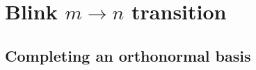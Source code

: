 \documentclass{article}
\begin{document}
%
%
%
%
%
%
%
%
%
%
%
%
%
%

%

%
%
%
%
%
%
%
%
%
%

%
%
%
%
%
%
%
	
%
%
%
%
%
%
%

%
%
%
	
%
%
%
%

%
%
%
%
%
%
%
%
%
%
%
%
%
%
%
%



%
%
%
%
%
%
%
%
%
%
%
%
%
%
%
%
%
%
%
%
%
%
%
%
%
%
%
%
%
%
%
%
%
%
%
%
%
%
%
%
%

%

%
%
%
%
%

%
%
%
%
%
%

%
%
%
%
%
%
%
%
%
%
%
%
%
%
%
%
%
%
%
%
%
%
%
%
%
%
%
%
%
%
%
%
%
%
%
%
%
%
%
%

%
%
%
%
%
%
%
%
%
%
%
%
%
%
%
%
%
%
%
%
%
%
%
%
%
%
%
%
%
%
%
%
%
%
%
%
%
%
%
%
%
%
	
%
%
%
%
%
%
%
%
%
%
%
%
%
%
%
%
%
%
%
%
%
%
%
%
%
%
%
%
%
%









\section{Blink \texorpdfstring{$m\to n$}{m -> n} transition}\label{sec:Blinkered-transition}

\subsection{Completing an orthonormal basis}\label{subsec:completebasis}
\end{document}
